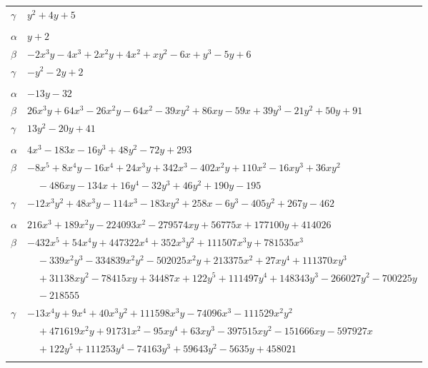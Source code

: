 \documentclass[11pt]{article}
\begin{document}
\begin{longtable}{@{}ll@{}}
$\gamma$ & $y^{2}+4y+5$\\
\addlinespace[3pt]
\multicolumn{2}{@{}l}{$\{i,j\}=\{41,43\}$, $k_{ij}=2\cdot 7$}\\
$\alpha$ & $y+2$\\
$\beta$ & $-2x^{3}y-4x^{3}+2x^{2}y+4x^{2}+xy^{2}-6x+y^{3}-5y+6$\\
$\gamma$ & $-y^{2}-2y+2$\\
\addlinespace[3pt]
\multicolumn{2}{@{}l}{$\{i,j\}=\{41,62\}$, $k_{ij}=2^{2}\cdot 3^{2}$}\\
$\alpha$ & $-13y-32$\\
$\beta$ & $26x^{3}y+64x^{3}-26x^{2}y-64x^{2}-39xy^{2}+86xy-59x+39y^{3}-21y^{2}+50y+91$\\
$\gamma$ & $13y^{2}-20y+41$\\
\addlinespace[3pt]
\multicolumn{2}{@{}l}{$\{i,j\}=\{42,99\}$, $k_{ij}=2^{2}\cdot 3^{2}\cdot 19$}\\
$\alpha$ & $4x^{3}-183x-16y^{3}+48y^{2}-72y+293$\\
$\beta$ & $-8x^{5}+8x^{4}y-16x^{4}+24x^{3}y+342x^{3}-402x^{2}y+110x^{2}-16xy^{3}+36xy^{2}$\\
 & $\quad -486xy-134x+16y^{4}-32y^{3}+46y^{2}+190y-195$\\
$\gamma$ & $-12x^{3}y^{2}+48x^{3}y-114x^{3}-183xy^{2}+258x-6y^{3}-405y^{2}+267y-462$\\
\addlinespace[3pt]
\multicolumn{2}{@{}l}{$\{i,j\}=\{42,126\}$, $k_{ij}=2^{3}\cdot 3^{3}\cdot 19^{3}$}\\
$\alpha$ & $216x^{3}+189x^{2}y-224093x^{2}-279574xy+56775x+177100y+414026$\\
$\beta$ & $-432x^{5}+54x^{4}y+447322x^{4}+352x^{3}y^{2}+111507x^{3}y+781535x^{3}$\\
 & $\quad -339x^{2}y^{3}-334839x^{2}y^{2}-502025x^{2}y+213375x^{2}+27xy^{4}+111370xy^{3}$\\
 & $\quad +31138xy^{2}-78415xy+34487x+122y^{5}+111497y^{4}+148343y^{3}-266027y^{2}-700225y$\\
 & $\quad -218555$\\
$\gamma$ & $-13x^{4}y+9x^{4}+40x^{3}y^{2}+111598x^{3}y-74096x^{3}-111529x^{2}y^{2}$\\
 & $\quad +471619x^{2}y+91731x^{2}-95xy^{4}+63xy^{3}-397515xy^{2}-151666xy-597927x$\\
 & $\quad +122y^{5}+111253y^{4}-74163y^{3}+59643y^{2}-5635y+458021$\\
\addlinespace[3pt]
\multicolumn{2}{@{}l}{$\{i,j\}=\{42,127\}$, $k_{ij}=2^{2}\cdot 3^{4}\cdot 7^{2}\cdot 19$}\\

\end{longtable}
\end{document}
